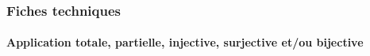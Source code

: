 \documentclass[12pt,a4paper]{article}
\begin{document}


\subsubsection{Fiches techniques}

\paragraph{Application totale, partielle, injective, surjective et/ou bijective}

\vspace{-.75em}
\begin{multicols}{2}
    
    
    
    
    
    
    
\end{multicols}
\end{document}
